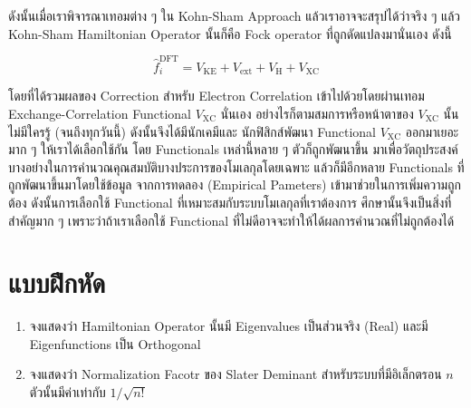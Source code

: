 ดังนั้นเมื่อเราพิจารณาเทอมต่าง ๆ ใน Kohn-Sham Approach แล้วเราอาจจะสรุปได้ว่าจริง ๆ แล้ว Kohn-Sham Hamiltonian Operator นั้นก็คือ
Fock operator ที่ถูกดัดแปลงมานั่นเอง ดังนี้

\begin{equation}
    \hat{f}_i^{\mathrm{DFT}}
    =
    V_{\mathrm{KE}}
    + V_{\mathrm{ext}}
    + V_{\mathrm{H}}
    + V_{\mathrm{XC}}
\end{equation}

\noindent โดยที่ได้รวมผลของ Correction สำหรับ Electron Correlation เข้าไปด้วยโดยผ่านเทอม Exchange-Correlation Functional
$V_{\mathrm{XC}}$ นั่นเอง อย่างไรก็ตามสมการหรือหน้าตาของ $V_{\mathrm{XC}}$ นั้นไม่มีใครรู้ (จนถึงทุกวันนี้) ดังนั้นจึงได้มีนักเคมีและ%
นักฟิสิกส์พัฒนา Functional $V_{\mathrm{XC}}$ ออกมาเยอะมาก ๆ ให้เราได้เลือกใช้กัน โดย Functionals เหล่านี้หลาย ๆ ตัวก็ถูกพัฒนาขึ้น%
มาเพื่อวัตถุประสงค์บางอย่างในการคำนวณคุณสมบัติบางประการของโมเลกุลโดยเฉพาะ แล้วก็มีอีกหลาย Functionals ที่ถูกพัฒนาขึ้นมาโดยใช้ข้อมูล%
จากการทดลอง (Empirical Pameters) เข้ามาช่วยในการเพิ่มความถูกต้อง ดังนั้นการเลือกใช้ Functional ที่เหมาะสมกับระบบโมเลกุลที่เราต้องการ%
ศึกษานั้นจึงเป็นสิ่งที่สำคัญมาก ๆ เพราะว่าถ้าเราเลือกใช้ Functional ที่ไม่ดีอาจจะทำให้ได้ผลการคำนวณที่ไม่ถูกต้องได้

\section{แบบฝึกหัด}

\begin{enumerate}
    \item จงแสดงว่า Hamiltonian Operator นั้นมี Eigenvalues เป็นส่วนจริง (Real) และมี Eigenfunctions เป็น Orthogonal

    \item จงแสดงว่า Normalization Facotr ของ Slater Deminant สำหรับระบบที่มีอิเล็กตรอน $n$ ตัวนั้นมีค่าเท่ากับ $1 / \sqrt{n!}$
\end{enumerate}
